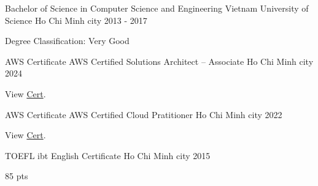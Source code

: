 

\begin{cventries}

  \cventry
    {Bachelor of Science in Computer Science and Engineering} %
    {Vietnam University of Science} %
    {Ho Chi Minh city} %
    {2013 - 2017} %
    {
      \begin{cvitems} %
        \item {Degree Classification: Very Good}
      \end{cvitems}
    }

\cventry
    {AWS Certificate} %
    {AWS Certified Solutions Architect – Associate} %
    {Ho Chi Minh city} %
    {2024} %
    {
    \begin{cvitems} %
        \item {
         View 
    \href{https://www.credly.com/badges/dbd8fac9-4fa7-4f2f-9c78-dce2d3b4d856/public_url}{Cert}.
        }
      \end{cvitems}
    }
\cventry
    {AWS Certificate} %
    {AWS Certified Cloud Pratitioner} %
    {Ho Chi Minh city} %
    {2022} %
    {
      \begin{cvitems} %
        \item {
         View 
    \href{https://www.credly.com/badges/9a029de9-a984-42d3-bc0d-5810ec42e49d/public_url}{Cert}.
        }
      \end{cvitems}
    }
    
\cventry
    {TOEFL ibt} %
    {English Certificate} %
    {Ho Chi Minh city} %
    {2015} %
    {
      \begin{cvitems} %
        \item {85 pts}
      \end{cvitems}
    }

\end{cventries}
